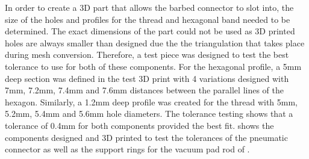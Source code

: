 In order to create a 3D part that allows the barbed connector to slot into, the size of the holes and profiles for the thread and hexagonal band needed to be determined. The exact dimensions of the part could not be used as 3D printed holes are always smaller than designed due the the triangulation that takes place during mesh conversion. Therefore, a test piece was designed to test the best tolerance to use for both of these components. For the hexagonal profile, a 5mm deep section was defined in the test 3D print with 4 variations designed with 7mm, 7.2mm, 7.4mm and 7.6mm distances between the parallel lines of the hexagon. Similarly, a 1.2mm deep profile was created for the thread with 5mm, 5.2mm, 5.4mm and 5.6mm hole diameters. The tolerance testing shows that a tolerance of 0.4mm for both components provided the best fit.  shows the components designed and 3D printed to test the tolerances of the pneumatic connector as well as the support rings for the vacuum pad rod of .

